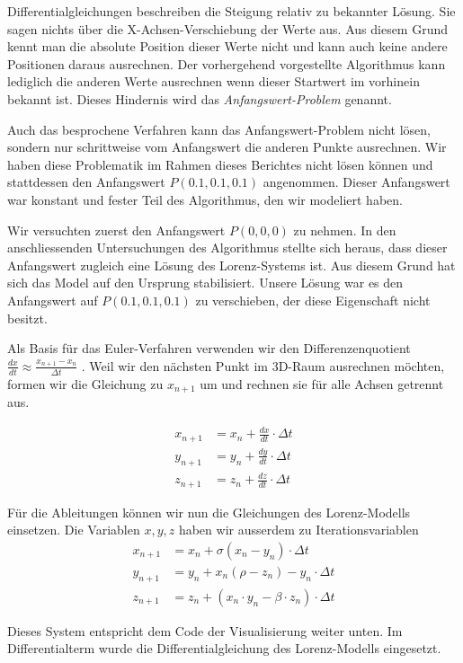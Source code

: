 Differentialgleichungen beschreiben die Steigung relativ zu bekannter Lösung. Sie sagen nichts über die X-Achsen-Verschiebung der Werte aus. Aus diesem Grund kennt man die absolute Position dieser Werte nicht und kann auch keine andere Positionen daraus ausrechnen. Der vorhergehend vorgestellte Algorithmus kann lediglich die anderen Werte ausrechnen wenn dieser Startwert im vorhinein bekannt ist. Dieses Hindernis wird das \textit{Anfangswert-Problem} genannt.

Auch das besprochene Verfahren kann das Anfangswert-Problem nicht lösen, sondern nur schrittweise vom Anfangswert die anderen Punkte ausrechnen. Wir haben diese Problematik im Rahmen dieses Berichtes nicht lösen können und stattdessen den Anfangswert $ P(0.1, 0.1, 0.1) $ angenommen. Dieser Anfangswert war konstant und fester Teil des Algorithmus, den wir modeliert haben.

Wir versuchten zuerst den Anfangswert $ P(0, 0, 0) $ zu nehmen. In den anschliessenden Untersuchungen des Algorithmus stellte sich heraus, dass dieser Anfangswert zugleich eine Lösung des Lorenz-Systems ist. Aus diesem Grund hat sich das Model auf den Ursprung stabilisiert. Unsere Lösung war es den Anfangswert auf $ P(0.1, 0.1, 0.1) $ zu verschieben, der diese Eigenschaft nicht besitzt.

Als Basis für das Euler-Verfahren verwenden wir den Differenzenquotient $ \frac{dx}{dt} \approx \frac{x_{n + 1} - x_n}{\Delta t} $ \cite{euler1768}.  Weil wir den nächsten Punkt im 3D-Raum ausrechnen möchten, formen wir die Gleichung zu $ x_{n + 1} $  um und rechnen sie für alle Achsen getrennt aus.

\begin{align}
    x_{n + 1} &= x_n + \frac{dx}{dt} \cdot \Delta t\\
    y_{n + 1} &= y_n + \frac{dy}{dt} \cdot \Delta t\\
    z_{n + 1} &= z_n + \frac{dz}{dt} \cdot \Delta t
\end{align}

Für die Ableitungen können wir nun die Gleichungen des Lorenz-Modells einsetzen. Die Variablen $ x, y, z $ haben wir ausserdem zu Iterationsvariablen 
\begin{align}
    x_{n + 1} &= x_n + \sigma(x_n - y_n) \cdot \Delta t\\
    y_{n + 1} &= y_n + x_n(\rho - z_n) - y_n \cdot \Delta t\\
    z_{n + 1} &= z_n + (x_n \cdot y_n - \beta \cdot z_n) \cdot \Delta t
\end{align}

Dieses System entspricht dem Code der Visualisierung weiter unten. Im Differentialterm wurde die Differentialgleichung des Lorenz-Modells eingesetzt.
